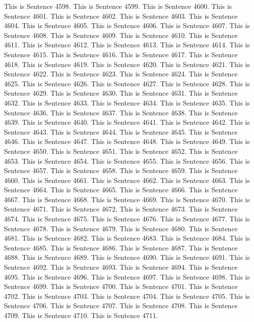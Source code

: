 \documentclass{article}
\begin{document}
This is Sentence 4598.
This is Sentence 4599.
This is Sentence 4600.
This is Sentence 4601.
This is Sentence 4602.
This is Sentence 4603.
This is Sentence 4604.
This is Sentence 4605.
This is Sentence 4606.
This is Sentence 4607.
This is Sentence 4608.
This is Sentence 4609.
This is Sentence 4610.
This is Sentence 4611.
This is Sentence 4612.
This is Sentence 4613.
This is Sentence 4614.
This is Sentence 4615.
This is Sentence 4616.
This is Sentence 4617.
This is Sentence 4618.
This is Sentence 4619.
This is Sentence 4620.
This is Sentence 4621.
This is Sentence 4622.
This is Sentence 4623.
This is Sentence 4624.
This is Sentence 4625.
This is Sentence 4626.
This is Sentence 4627.
This is Sentence 4628.
This is Sentence 4629.
This is Sentence 4630.
This is Sentence 4631.
This is Sentence 4632.
This is Sentence 4633.
This is Sentence 4634.
This is Sentence 4635.
This is Sentence 4636.
This is Sentence 4637.
This is Sentence 4638.
This is Sentence 4639.
This is Sentence 4640.
This is Sentence 4641.
This is Sentence 4642.
This is Sentence 4643.
This is Sentence 4644.
This is Sentence 4645.
This is Sentence 4646.
This is Sentence 4647.
This is Sentence 4648.
This is Sentence 4649.
This is Sentence 4650.
This is Sentence 4651.
This is Sentence 4652.
This is Sentence 4653.
This is Sentence 4654.
This is Sentence 4655.
This is Sentence 4656.
This is Sentence 4657.
This is Sentence 4658.
This is Sentence 4659.
This is Sentence 4660.
This is Sentence 4661.
This is Sentence 4662.
This is Sentence 4663.
This is Sentence 4664.
This is Sentence 4665.
This is Sentence 4666.
This is Sentence 4667.
This is Sentence 4668.
This is Sentence 4669.
This is Sentence 4670.
This is Sentence 4671.
This is Sentence 4672.
This is Sentence 4673.
This is Sentence 4674.
This is Sentence 4675.
This is Sentence 4676.
This is Sentence 4677.
This is Sentence 4678.
This is Sentence 4679.
This is Sentence 4680.
This is Sentence 4681.
This is Sentence 4682.
This is Sentence 4683.
This is Sentence 4684.
This is Sentence 4685.
This is Sentence 4686.
This is Sentence 4687.
This is Sentence 4688.
This is Sentence 4689.
This is Sentence 4690.
This is Sentence 4691.
This is Sentence 4692.
This is Sentence 4693.
This is Sentence 4694.
This is Sentence 4695.
This is Sentence 4696.
This is Sentence 4697.
This is Sentence 4698.
This is Sentence 4699.
This is Sentence 4700.
This is Sentence 4701.
This is Sentence 4702.
This is Sentence 4703.
This is Sentence 4704.
This is Sentence 4705.
This is Sentence 4706.
This is Sentence 4707.
This is Sentence 4708.
This is Sentence 4709.
This is Sentence 4710.
This is Sentence 4711.
\end{document}
